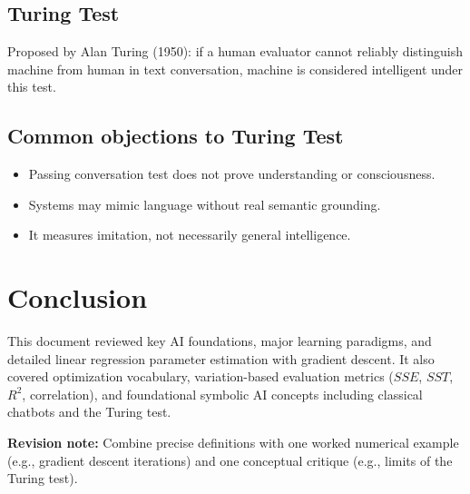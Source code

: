 \documentclass[12pt,a4paper]{article}
\begin{document}
\subsection*{Turing Test}
Proposed by Alan Turing (1950): if a human evaluator cannot reliably distinguish machine from human in text conversation, machine is considered intelligent under this test.

\subsection*{Common objections to Turing Test}
\begin{itemize}[noitemsep]
    \item Passing conversation test does not prove understanding or consciousness.
    \item Systems may mimic language without real semantic grounding.
    \item It measures imitation, not necessarily general intelligence.
\end{itemize}

\section{\textcolor{primary}{Conclusion}}

This document reviewed key AI foundations, major learning paradigms, and detailed linear regression parameter estimation with gradient descent. It also covered optimization vocabulary, variation-based evaluation metrics ($SSE$, $SST$, $R^2$, correlation), and foundational symbolic AI concepts including classical chatbots and the Turing test.

\textbf{Revision note:} Combine precise definitions with one worked numerical example (e.g., gradient descent iterations) and one conceptual critique (e.g., limits of the Turing test).
\end{document}
